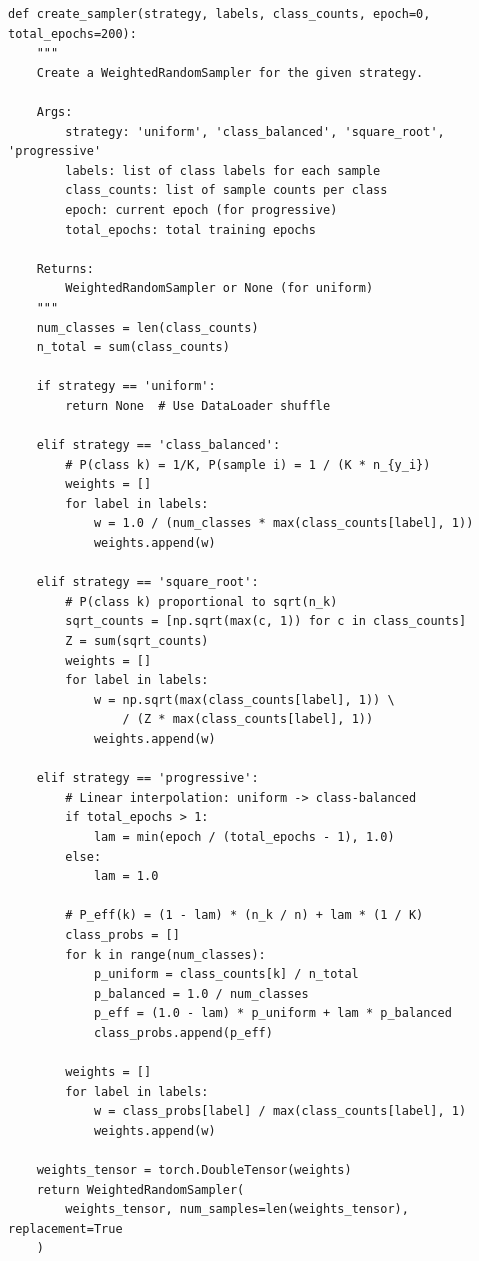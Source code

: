 \documentclass[12pt,a4paper]{article}
\begin{document}
\begin{lstlisting}[caption={Implementation of the four sampling strategies.}, label=lst:sampler]
def create_sampler(strategy, labels, class_counts, epoch=0, total_epochs=200):
    """
    Create a WeightedRandomSampler for the given strategy.
    
    Args:
        strategy: 'uniform', 'class_balanced', 'square_root', 'progressive'
        labels: list of class labels for each sample
        class_counts: list of sample counts per class
        epoch: current epoch (for progressive)
        total_epochs: total training epochs
    
    Returns:
        WeightedRandomSampler or None (for uniform)
    """
    num_classes = len(class_counts)
    n_total = sum(class_counts)
    
    if strategy == 'uniform':
        return None  # Use DataLoader shuffle
    
    elif strategy == 'class_balanced':
        # P(class k) = 1/K, P(sample i) = 1 / (K * n_{y_i})
        weights = []
        for label in labels:
            w = 1.0 / (num_classes * max(class_counts[label], 1))
            weights.append(w)
    
    elif strategy == 'square_root':
        # P(class k) proportional to sqrt(n_k)
        sqrt_counts = [np.sqrt(max(c, 1)) for c in class_counts]
        Z = sum(sqrt_counts)
        weights = []
        for label in labels:
            w = np.sqrt(max(class_counts[label], 1)) \
                / (Z * max(class_counts[label], 1))
            weights.append(w)
    
    elif strategy == 'progressive':
        # Linear interpolation: uniform -> class-balanced
        if total_epochs > 1:
            lam = min(epoch / (total_epochs - 1), 1.0)
        else:
            lam = 1.0
        
        # P_eff(k) = (1 - lam) * (n_k / n) + lam * (1 / K)
        class_probs = []
        for k in range(num_classes):
            p_uniform = class_counts[k] / n_total
            p_balanced = 1.0 / num_classes
            p_eff = (1.0 - lam) * p_uniform + lam * p_balanced
            class_probs.append(p_eff)
        
        weights = []
        for label in labels:
            w = class_probs[label] / max(class_counts[label], 1)
            weights.append(w)
    
    weights_tensor = torch.DoubleTensor(weights)
    return WeightedRandomSampler(
        weights_tensor, num_samples=len(weights_tensor), replacement=True
    )
\end{lstlisting}
\end{document}
